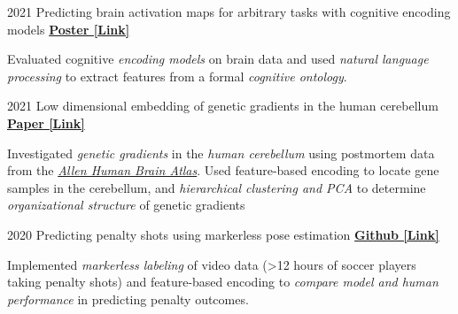 \begin{cventries}
  \cventry
    {2021} %
    {Predicting brain activation maps for arbitrary tasks with cognitive encoding models} %
    {\href{https://drive.google.com/file/d/1dRNSsRzGSSF9QJLJv_jK1R7BmmWfOsMt/view}{\textbf{Poster [Link]}}}
    {}
    {
      \begin{cvitems} %
      	\item {Evaluated cognitive \textit{encoding models} on brain data and used \textit{natural language processing} to extract features from a formal \textit{cognitive ontology}.}
      \end{cvitems}
    }   
    
    
  \cventry
    {2021} %
    {Low dimensional embedding of genetic gradients in the human cerebellum} %
    {\href{https://papers.ssrn.com/sol3/papers.cfm?abstract_id=3797269}{\textbf{Paper [Link]}}}
    {}
    {
      \begin{cvitems} %
      	\item {Investigated \textit{genetic gradients} in the \textit{human cerebellum} using postmortem data from the \href{https://human.brain-map.org/}{\textit{Allen Human Brain Atlas}}. Used feature-based encoding to locate gene samples in the cerebellum, and \textit{hierarchical clustering and PCA} to determine \textit{organizational structure} of genetic gradients}
      \end{cvitems}
    }
    
  \cventry
    {2020} %
    {Predicting penalty shots using markerless pose estimation} %
    {\href{https://github.com/maedbhk/action_prediction}{\textbf{Github [Link]}}}
    {}
    {
      \begin{cvitems} %
      	\item {Implemented \textit{markerless labeling} of video data (>12 hours of soccer players taking penalty shots) and feature-based encoding to \textit{compare model and human performance} in predicting penalty outcomes.}
      \end{cvitems}
    }   
    

\end{cventries}
